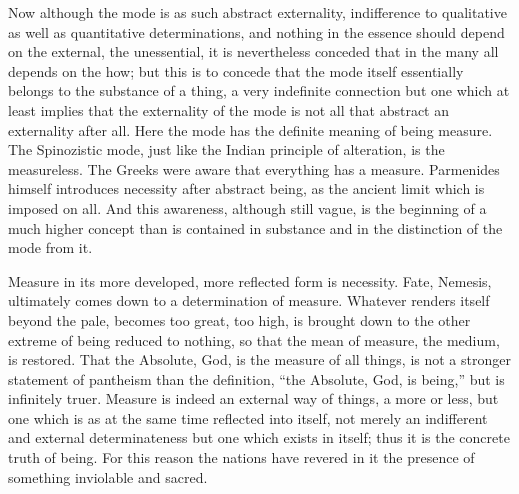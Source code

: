 Now although the mode is as such abstract externality,
indifference to qualitative as well as quantitative determinations,
and nothing in the essence should depend on the external,
the unessential, it is nevertheless conceded that
in the many all depends on the how;
but this is to concede that the mode itself
essentially belongs to the substance of a thing,
a very indefinite connection but
one which at least implies that the externality of
the mode is not all that abstract an externality after all.
Here the mode has the definite meaning of being measure.
The Spinozistic mode, just like the Indian principle of alteration,
is the measureless.
The Greeks were aware that everything has a measure.
Parmenides himself introduces necessity after abstract being,
as the ancient limit which is imposed on all.
And this awareness, although still vague, is
the beginning of a much higher concept
than is contained in substance
and in the distinction of the mode from it.

Measure in its more developed, more reflected form is necessity.
Fate, Nemesis, ultimately comes down to a determination of measure.
Whatever renders itself beyond the pale, becomes too great, too high,
is brought down to the other extreme of being reduced to nothing,
so that the mean of measure, the medium, is restored.
That the Absolute, God, is the measure of all things, is not
a stronger statement of pantheism than the definition,
“the Absolute, God, is being,” but is infinitely truer.
Measure is indeed an external way of things, a more or less,
but one which is as at the same time reflected into itself,
not merely an indifferent and external determinateness
but one which exists in itself;
thus it is the concrete truth of being.
For this reason the nations have revered in it
the presence of something inviolable and sacred.

